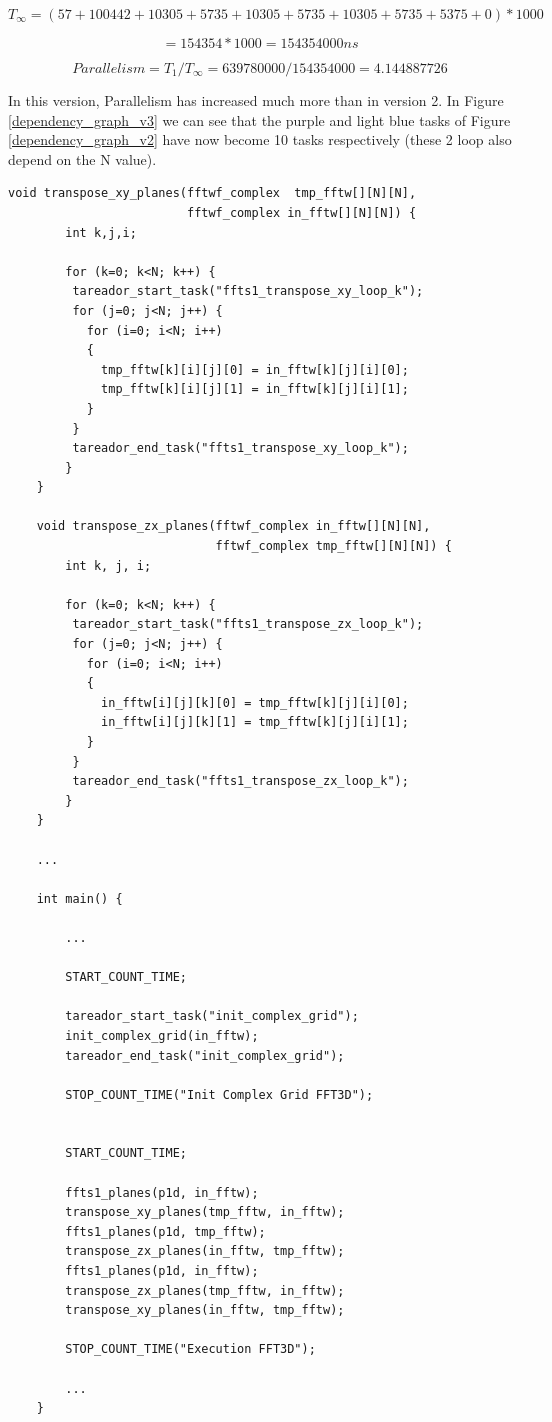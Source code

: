 \documentclass[12pt, a4paper]{article}
\begin{document}
\[ T_\infty = (57 + 100442 + 10305 + 5735 + 10305 + 5735 + 10305 + 5735 + 5375 + 0) * 1000 \]

\[ = 154354 * 1000 = 154354000 ns \]

\[ Parallelism = T_1/T_\infty = 639780000/154354000 = 4.144887726 \]

In this version, Parallelism has increased much more than in version 2. In Figure \ref{dependency_graph_v3} we can see that the purple and light blue tasks of Figure \ref{dependency_graph_v2} have now become 10 tasks respectively (these 2 loop also depend on the N value).

\begin{lstlisting}
void transpose_xy_planes(fftwf_complex  tmp_fftw[][N][N],
						 fftwf_complex in_fftw[][N][N]) {
	    int k,j,i;
	
	    for (k=0; k<N; k++) {
	     tareador_start_task("ffts1_transpose_xy_loop_k");
	     for (j=0; j<N; j++) {
	       for (i=0; i<N; i++)
	       {
	         tmp_fftw[k][i][j][0] = in_fftw[k][j][i][0];
	         tmp_fftw[k][i][j][1] = in_fftw[k][j][i][1];
	       }
	     }
	     tareador_end_task("ffts1_transpose_xy_loop_k");
	    }
	}
	
	void transpose_zx_planes(fftwf_complex in_fftw[][N][N],
							 fftwf_complex tmp_fftw[][N][N]) {
	    int k, j, i;
	
	    for (k=0; k<N; k++) {
	     tareador_start_task("ffts1_transpose_zx_loop_k");
	     for (j=0; j<N; j++) {
	       for (i=0; i<N; i++)
	       {
	         in_fftw[i][j][k][0] = tmp_fftw[k][j][i][0];
	         in_fftw[i][j][k][1] = tmp_fftw[k][j][i][1];
	       }
	     }
	     tareador_end_task("ffts1_transpose_zx_loop_k");
	    }
	}
	
	...
	
	int main() {
	
		...	
		
	    START_COUNT_TIME;
	    
	    tareador_start_task("init_complex_grid");
	    init_complex_grid(in_fftw);
	    tareador_end_task("init_complex_grid");
	
	    STOP_COUNT_TIME("Init Complex Grid FFT3D");
	
	
	    START_COUNT_TIME;
	
	    ffts1_planes(p1d, in_fftw);
	    transpose_xy_planes(tmp_fftw, in_fftw);
	    ffts1_planes(p1d, tmp_fftw);
	    transpose_zx_planes(in_fftw, tmp_fftw);
	    ffts1_planes(p1d, in_fftw);
	    transpose_zx_planes(tmp_fftw, in_fftw);
	    transpose_xy_planes(in_fftw, tmp_fftw);
	     
	    STOP_COUNT_TIME("Execution FFT3D");
	    
	    ...
	}
\end{lstlisting}
\end{document}
